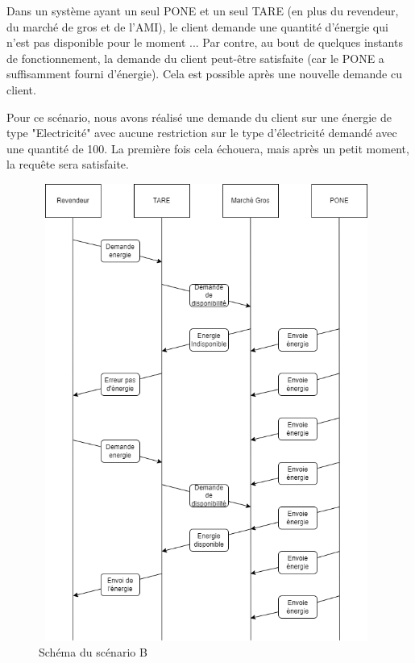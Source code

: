 Dans un système ayant un seul PONE et un seul TARE (en plus du revendeur, du marché de gros et de l'AMI), le client demande une quantité d'énergie qui n'est pas disponible pour le moment ... Par contre, au bout de quelques instants de fonctionnement, la demande du client peut-être satisfaite (car le PONE a suffisamment fourni d'énergie). Cela est possible après une nouvelle demande cu client.

Pour ce scénario, nous avons réalisé une demande du client sur une énergie de type "Electricité" avec aucune restriction sur le type d'électricité demandé avec une quantité de 100. La première fois cela échouera, mais après un petit moment, la requête sera satisfaite.

\begin{figure}[h]
    \centering
    \includegraphics[width=110mm, height=150mm]{images/ScenarioB.png}
    \caption{Schéma du scénario B}
    \label{img:mesh23}
\end{figure}
\newpage